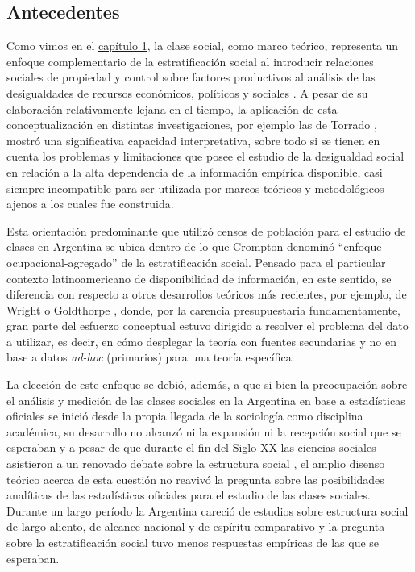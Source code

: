 \documentclass[
]{book}
\begin{document}
\hypertarget{antecedentes}{%
\subsection{Antecedentes}\label{antecedentes}}

Como vimos en el \protect\hyperlink{estructura1}{capítulo 1}, la clase social, como marco teórico, representa un enfoque complementario de la estratificación social al introducir relaciones sociales de propiedad y control sobre factores productivos al análisis de las desigualdades de recursos económicos, políticos y sociales \citep{Kerbo2003}. A pesar de su elaboración relativamente lejana en el tiempo, la aplicación de esta conceptualización en distintas investigaciones, por ejemplo las de Torrado \citeyearpar{Torrado1992}, mostró una significativa capacidad interpretativa, sobre todo si se tienen en cuenta los problemas y limitaciones que posee el estudio de la desigualdad social en relación a la alta dependencia de la información empírica disponible, casi siempre incompatible para ser utilizada por marcos teóricos y metodológicos ajenos a los cuales fue construida.

Esta orientación predominante que utilizó censos de población para el estudio de clases en Argentina se ubica dentro de lo que Crompton \citeyearpar{Crompton2008} denominó ``enfoque ocupacional-agregado'' de la estratificación social. Pensado para el particular contexto latinoamericano de disponibilidad de información, en este sentido, se diferencia con respecto a otros desarrollos teóricos más recientes, por ejemplo, de Wright \citetext{\citeyear{Wright1997}; \citeyear{Wright2005}} o Goldthorpe \citeyearpar{Goldthorpe1995}, donde, por la carencia presupuestaria fundamentamente, gran parte del esfuerzo conceptual estuvo dirigido a resolver el problema del dato a utilizar, es decir, en cómo desplegar la teoría con fuentes secundarias y no en base a datos \emph{ad-hoc} (primarios) para una teoría específica.

La elección de este enfoque se debió, además, a que si bien la preocupación sobre el análisis y medición de las clases sociales en la Argentina en base a estadísticas oficiales se inició desde la propia llegada de la sociología como disciplina académica, su desarrollo no alcanzó ni la expansión ni la recepción social que se esperaban y a pesar de que durante el fin del Siglo XX las ciencias sociales asistieron a un renovado debate sobre la estructura social \citep{Kerbo2003, Martinez2005, Crompton2008}, el amplio disenso teórico acerca de esta cuestión no reavivó la pregunta sobre las posibilidades analíticas de las estadísticas oficiales para el estudio de las clases sociales. Durante un largo período la Argentina careció de estudios sobre estructura social de largo aliento, de alcance nacional y de espíritu comparativo y la pregunta sobre la estratificación social tuvo menos respuestas empíricas de las que se esperaban.
\end{document}
